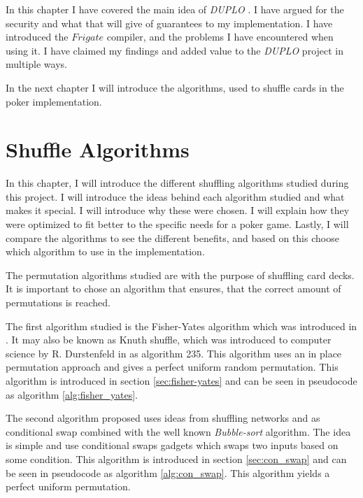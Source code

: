 \documentclass[twoside,11pt,openright]{report}
\newcommand{\DUPLO}{\textit{DUPLO} }
\begin{document}
\bigskip

In this chapter I have covered the main idea of \DUPLO. I have argued for the security and what that will give of guarantees to my implementation. I have introduced the $Frigate$ compiler, and the problems I have encountered when using it. I have claimed my findings and added value to the \DUPLO project in multiple ways.

In the next chapter I will introduce the algorithms, used to shuffle cards in the poker implementation.


\chapter{Shuffle Algorithms}
\label{ch:shuffle}
In this chapter, I will introduce the different shuffling algorithms studied during this project. I will introduce the ideas behind each algorithm studied and what makes it special. I will introduce why these were chosen. I will explain how they were optimized to fit better to the specific needs for a poker game. Lastly, I will compare the algorithms to see the different benefits, and based on this choose which algorithm to use in the implementation.

The permutation algorithms studied are with the purpose of shuffling card decks. It is important to chose an algorithm that ensures, that the correct amount of permutations is reached.

The first algorithm studied is the Fisher-Yates algorithm which was introduced in \cite{fisher_yates}. It may also be known as Knuth shuffle, which was introduced to computer science by R. Durstenfeld in \cite{durstenfeld} as algorithm 235. This algorithm uses an in place permutation approach and gives a perfect uniform random permutation. This algorithm is introduced in section \ref{sec:fisher-yates} and can be seen in pseudocode as algorithm \ref{alg:fisher_yates}.

The second algorithm proposed uses ideas from shuffling networks and \cite{psi} as conditional swap combined with the well known \textit{Bubble-sort} algorithm. The idea is simple and use conditional swaps gadgets which swaps two inputs based on some condition. This algorithm is introduced in section \ref{sec:con_swap} and can be seen in pseudocode as algorithm \ref{alg:con_swap}. This algorithm yields a perfect uniform permutation.
\end{document}
